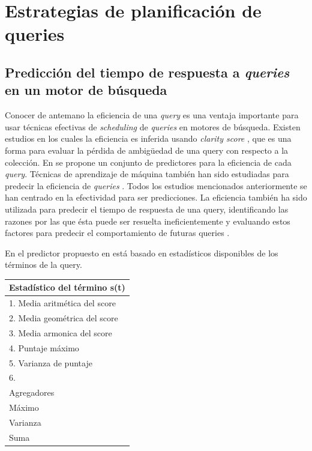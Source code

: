 \chapter{Estrategias de planificación de queries}
\label{cap:epq}


\section{Predicción del tiempo de respuesta a \textit{queries} en un motor de búsqueda}
\label{scheduling:ptrq}
Conocer de antemano la eficiencia de una \textit{query} es una ventaja importante para usar técnicas efectivas de \textit{scheduling} de \textit{queries} en motores de búsqueda. Existen estudios en los cuales la eficiencia es inferida usando \textit{clarity score} \citep{Cronen-Townsend:2002}, que es una forma para evaluar la pérdida de ambigüedad de una query con respecto a la colección. En \citep{He:2004} se propone un conjunto de predictores para la eficiencia de cada \textit{query}. Técnicas de aprendizaje de máquina también han sido estudiadas para predecir la eficiencia de \textit{queries} \citep{Si:2002}. Todos los estudios mencionados anteriormente se han centrado en la efectividad para ser predicciones. La eficiencia también ha sido utilizada para predecir el tiempo de respuesta de una query, identificando las razones por las que ésta puede ser resuelta ineficientemente y evaluando estos factores para predecir el comportamiento de futuras queries \citep{Tonellotto:2011}.

En el predictor propuesto en \citep{Macdonald:2012} está basado en estadísticos  disponibles de los términos de la query. 

\begin{tabular}{|l|}
\hline 
Estadístico del término s(t) \\ 
\hline 
1. Media aritmética del score \\ 
\hline 
2. Media geométrica del score \\ 
\hline 
3. Media armonica del score \\ 
\hline 
4. Puntaje máximo \\ 
\hline 
5. Varianza de puntaje \\ 
\hline 
6.  \\ 
\hline 
Agregadores \\ 
\hline 
Máximo \\ 
\hline 
Varianza \\ 
\hline 
Suma \\ 
\hline 
\end{tabular} 


